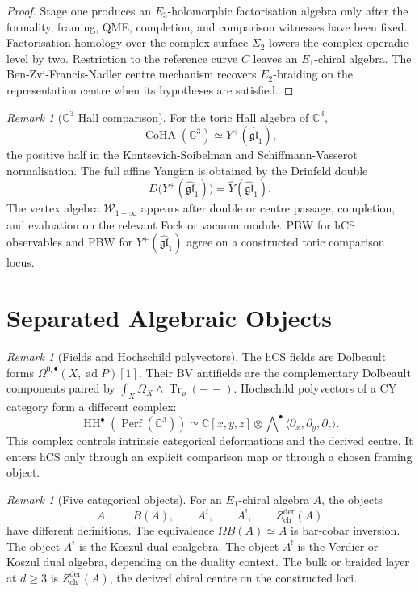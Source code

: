 \documentclass[11pt]{amsart}
\providecommand{\C}{\mathbb{C}}
\providecommand{\Tr}{\operatorname{Tr}}
\providecommand{\Perf}{\operatorname{Perf}}
\providecommand{\HH}{\operatorname{HH}}
\providecommand{\CoHA}{\operatorname{CoHA}}
\providecommand{\Eone}{E_1}
\providecommand{\Etwo}{E_2}
\providecommand{\Ethree}{E_3}
\providecommand{\Yp}{Y^{+}}
\providecommand{\Woneinf}{\mathcal{W}_{1+\infty}}
\providecommand{\Zchder}{Z^{\mathrm{der}}_{\mathrm{ch}}}
\theoremstyle{plain}
\theoremstyle{definition}
\theoremstyle{remark}
\newtheorem{remark}[theorem]{Remark}
\begin{document}
\begin{proof}
Stage one produces an \(\Ethree\)-holomorphic factorisation algebra only
after the formality, framing, QME, completion, and comparison witnesses
have been fixed. Factorisation homology over the complex surface
\(\Sigma_2\) lowers the complex operadic level by two. Restriction to
the reference curve \(C\) leaves an \(\Eone\)-chiral algebra. The
Ben-Zvi-Francis-Nadler centre mechanism recovers \(\Etwo\)-braiding on
the representation centre when its hypotheses are satisfied.
\end{proof}

\begin{remark}[\(\C^3\) Hall comparison]
\label{rem:c3-hall-comparison}
For the toric Hall algebra of \(\C^3\),
\[
  \CoHA(\C^3)\simeq \Yp(\widehat{\mathfrak{gl}}_1),
\]
the positive half in the Kontsevich-Soibelman and
Schiffmann-Vasserot normalisation. The full affine Yangian is obtained
by the Drinfeld double
\[
  D\bigl(\Yp(\widehat{\mathfrak{gl}}_1)\bigr)
  =
  \widehat Y(\widehat{\mathfrak{gl}}_1).
\]
The vertex algebra \(\Woneinf\) appears after double or centre passage,
completion, and evaluation on the relevant Fock or vacuum module. PBW
for hCS observables and PBW for \(\Yp(\widehat{\mathfrak{gl}}_1)\)
agree on a constructed toric comparison locus.
\end{remark}

\section{Separated Algebraic Objects}
\label{sec:separated-objects}

\begin{remark}[Fields and Hochschild polyvectors]
\label{rem:fields-polyvectors}
The hCS fields are Dolbeault forms
\(\Omega^{0,\bullet}(X,\operatorname{ad}P)[1]\). Their BV antifields are
the complementary Dolbeault components paired by
\(\int_X\Omega_X\wedge\Tr_\rho(-\, -)\). Hochschild polyvectors of a CY
category form a different complex:
\[
  \HH^\bullet(\Perf(\C^3))
  \simeq
  \C[x,y,z]\otimes
  \bigwedge\nolimits^\bullet
  \langle\partial_x,\partial_y,\partial_z\rangle .
\]
This complex controls intrinsic categorical deformations and the
derived centre. It enters hCS only through an explicit comparison map or
through a chosen framing object.
\end{remark}

\begin{remark}[Five categorical objects]
\label{rem:five-categorical-objects}
For an \(\Eone\)-chiral algebra \(A\), the objects
\[
  A,\qquad B(A),\qquad A^i,\qquad A^!,\qquad \Zchder(A)
\]
have different definitions. The equivalence \(\Omega B(A)\simeq A\) is
bar-cobar inversion. The object \(A^i\) is the Koszul dual coalgebra.
The object \(A^!\) is the Verdier or Koszul dual algebra, depending on
the duality context. The bulk or braided layer at \(d\geq3\) is
\(\Zchder(A)\), the derived chiral centre on the constructed loci.
\end{remark}
\end{document}
